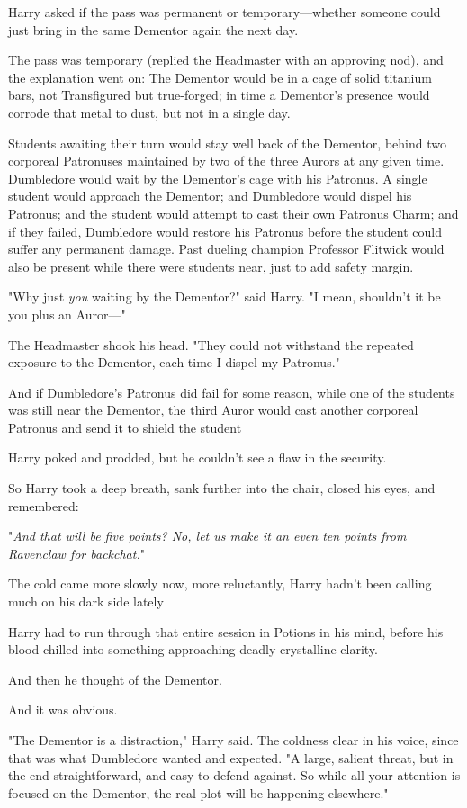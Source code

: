 Harry asked if the pass was permanent or temporary---whether someone could just
bring in the same Dementor again the next day.

The pass was temporary (replied the Headmaster with an approving nod), and the
explanation went on: The Dementor would be in a cage of solid titanium bars,
not Transfigured but true-forged; in time a Dementor's presence would corrode
that metal to dust, but not in a single day.

Students awaiting their turn would stay well back of the Dementor, behind two
corporeal Patronuses maintained by two of the three Aurors at any given time.
Dumbledore would wait by the Dementor's cage with his Patronus. A single
student would approach the Dementor; and Dumbledore would dispel his Patronus;
and the student would attempt to cast their own Patronus Charm; and if they
failed, Dumbledore would restore his Patronus before the student could suffer
any permanent damage. Past dueling champion Professor Flitwick would also be
present while there were students near, just to add safety margin.

"Why just \emph{you} waiting by the Dementor?" said Harry. "I mean, shouldn't
it be you plus an Auror\mbox{---}"

The Headmaster shook his head. "They could not withstand the repeated exposure
to the Dementor, each time I dispel my Patronus."

And if Dumbledore's Patronus did fail for some reason, while one of the
students was still near the Dementor, the third Auror would cast another
corporeal Patronus and send it to shield the student{\el}

Harry poked and prodded, but he couldn't see a flaw in the security.

So Harry took a deep breath, sank further into the chair, closed his eyes, and
remembered:

"\emph{And that will be{\el} five points? No, let us make it an even ten
points from Ravenclaw for backchat.}"

The cold came more slowly now, more reluctantly, Harry hadn't been calling much
on his dark side lately{\el}

Harry had to run through that entire session in Potions in his mind, before his
blood chilled into something approaching deadly crystalline clarity.

And then he thought of the Dementor.

And it was obvious.

"The Dementor is a distraction," Harry said. The coldness clear in his voice,
since that was what Dumbledore wanted and expected. "A large, salient threat,
but in the end straightforward, and easy to defend against. So while all your
attention is focused on the Dementor, the real plot will be happening
elsewhere."

